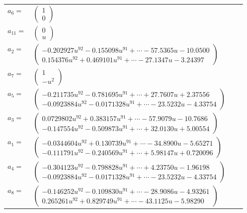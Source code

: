 \documentclass[1p]{elsarticle_modified}
\theoremstyle{definition}
\begin{document}
\begin{tabular}{m{7pt} m{180pt} m{7pt} m{180pt} }
\flushright $a_{6}=$&$\begin{pmatrix}1\\0\end{pmatrix}$ \\
\flushright $a_{11}=$&$\begin{pmatrix}0\\u\end{pmatrix}$ \\
\flushright $a_{2}=$&$\begin{pmatrix}-0.202927 u^{92}-0.155098 u^{91}+\cdots-57.5365 u-10.0500\\0.154376 u^{92}+0.469101 u^{91}+\cdots-27.1347 u-3.24397\end{pmatrix}$ \\
\flushright $a_{7}=$&$\begin{pmatrix}1\\- u^2\end{pmatrix}$ \\
\flushright $a_{5}=$&$\begin{pmatrix}-0.211735 u^{92}-0.781695 u^{91}+\cdots+27.7607 u+2.37556\\-0.0923884 u^{92}-0.0171328 u^{91}+\cdots-23.5232 u-4.33754\end{pmatrix}$ \\
\flushright $a_{3}=$&$\begin{pmatrix}0.0729802 u^{92}+0.383157 u^{91}+\cdots-57.9079 u-10.7686\\-0.147554 u^{92}-0.509873 u^{91}+\cdots+32.0130 u+5.00554\end{pmatrix}$ \\
\flushright $a_{1}=$&$\begin{pmatrix}-0.0344604 u^{92}+0.130739 u^{91}+\cdots-34.8900 u-5.65271\\-0.111791 u^{92}-0.240569 u^{91}+\cdots+5.98147 u+0.720096\end{pmatrix}$ \\
\flushright $a_{4}=$&$\begin{pmatrix}-0.304123 u^{92}-0.798828 u^{91}+\cdots+4.23750 u-1.96198\\-0.0923884 u^{92}-0.0171328 u^{91}+\cdots-23.5232 u-4.33754\end{pmatrix}$ \\
\flushright $a_{8}=$&$\begin{pmatrix}-0.146252 u^{92}-0.109830 u^{91}+\cdots-28.9086 u-4.93261\\0.265261 u^{92}+0.829749 u^{91}+\cdots-43.1125 u-5.98290\end{pmatrix}$ \\

\end{tabular}
\end{document}
